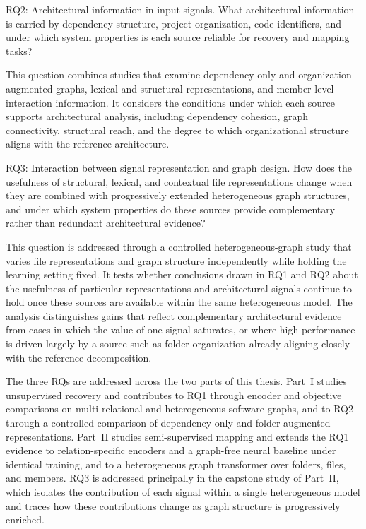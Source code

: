 \begin{GrayBox}{RQ2: Architectural information in input signals.}
What architectural information is carried by dependency structure, project organization, code identifiers, and under which system properties is each source reliable for recovery and mapping tasks?
\end{GrayBox}

This question combines studies that examine dependency-only and organization-augmented graphs, lexical and structural representations, and member-level interaction information. It considers the conditions under which each source supports architectural analysis, including dependency cohesion, graph connectivity, structural reach, and the degree to which organizational structure aligns with the reference architecture.


\begin{GrayBox}{RQ3: Interaction between signal representation and graph design.}
How does the usefulness of structural, lexical, and contextual file representations change when they are combined with progressively extended heterogeneous graph structures, and under which system properties do these sources provide complementary rather than redundant architectural evidence?
\end{GrayBox}

This question is addressed through a controlled heterogeneous-graph study that varies file representations and graph structure independently while holding the learning setting fixed. It tests whether conclusions drawn in RQ1 and RQ2 about the usefulness of particular representations and architectural signals continue to hold once these sources are available within the same heterogeneous model. The analysis distinguishes gains that reflect complementary architectural evidence from cases in which the value of one signal saturates, or where high performance is driven largely by a source such as folder organization already aligning closely with the reference decomposition.

The three RQs are addressed across the two parts of this thesis. Part~I studies unsupervised recovery and contributes to RQ1 through encoder and objective comparisons on multi-relational and heterogeneous software graphs, and to RQ2 through a controlled comparison of dependency-only and folder-augmented representations. Part~II studies semi-supervised mapping and extends the RQ1 evidence to relation-specific encoders and a graph-free neural baseline under identical training, and to a heterogeneous graph transformer over folders, files, and members. RQ3 is addressed principally in the capstone study of Part~II, which isolates the contribution of each signal within a single heterogeneous model and traces how these contributions change as graph structure is progressively enriched.
